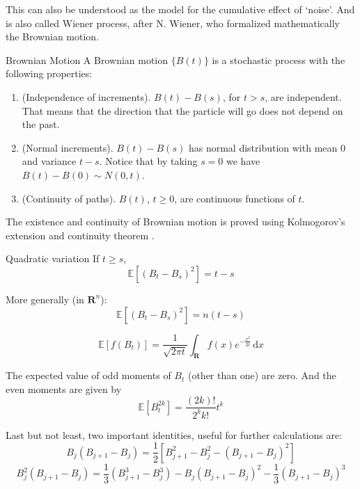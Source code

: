This can also be understood as the model for the cumulative effect of `noise'. And is also called Wiener process, after N. Wiener, who formalized mathematically the Brownian motion.

\begin{definition}[]{Brownian Motion}{}
	A Brownian motion $\{ B(t) \}$ is a stochastic process with the following properties:
	\begin{enumerate}
		\item (Independence of increments). $B(t) - B(s)$, for $t > s$, are independent. That means that the direction that the particle will go does not depend on the past.
		\item (Normal increments). $B(t) - B(s)$ has normal distribution with mean $0$ and variance $t - s$. Notice that by taking $s = 0$ we have $B(t) - B(0) \sim N(0,t)$.
		\item (Continuity of paths). $B(t)$, $t \geq 0$, are continuous functions of $t$. 
	\end{enumerate}
\end{definition}

The existence and continuity of Brownian motion is proved using Kolmogorov's extension and continuity theorem \cite{oksendal2013stochastic}.

\begin{theorem}[]{Quadratic variation}{}
	If $t \geq s$,
	\[
		\mathbb{E}[(B_t - B_s)^2] = t - s
	\]
	
	More generally (in $\textbf{R}^n$):
	\[
		\mathbb{E}[(B_t - B_s)^2] = n(t - s)
	\]
\end{theorem}


\begin{theorem}[]{}{}
	\[
		\mathbb{E}[f(B_t)] = \frac{1}{\sqrt{2 \pi t}} \int_{\textbf{R}} f(x) e^{-\frac{x^2}{2t}} \, \mathrm{d}x
	\]
\end{theorem}

\begin{theorem}[]{}{}
	The expected value of odd moments of $B_t$ (other than one) are zero. And the even moments are given by
	\[
		\mathbb{E}[B_t^{2k}] = \frac{(2k)!}{2^k k!} t^k
	\]
\end{theorem}

Last but not least, two important identities, useful for further calculations are:
\[
	B_j (B_{j+1} - B_j) = \frac{1}{2} [B_{j+1}^2 - B_j^2 - (B_{j+1} - B_j)^2]
\]
\[
	B_j^2 (B_{j+1} - B_j) = \frac{1}{3} (B_{j+1}^3 - B_j^3) - B_j(B_{j+1} - B_j)^2 - \frac{1}{3}(B_{j+1} - B_j)^3
\]

